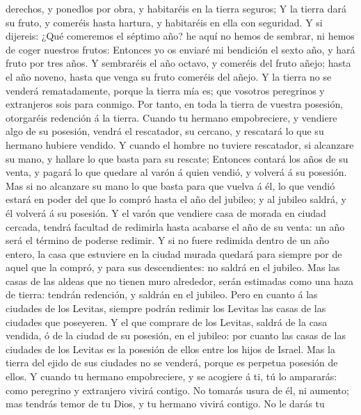 derechos, y ponedlos por obra, y habitaréis en la tierra seguros;
 Y la tierra dará su fruto, y comeréis hasta hartura, y
habitaréis en ella con seguridad.  Y si dijereis: ¿Qué
comeremos el séptimo año? he aquí no hemos de sembrar, ni hemos de coger
nuestros frutos:  Entonces yo os enviaré mi bendición el
sexto año, y hará fruto por tres años.  Y sembraréis el año
octavo, y comeréis del fruto añejo; hasta el año noveno, hasta que venga
su fruto comeréis del añejo.  Y la tierra no se venderá
rematadamente, porque la tierra mía es; que vosotros peregrinos y
extranjeros sois para conmigo.  Por tanto, en toda la
tierra de vuestra posesión, otorgaréis redención á la tierra.
 Cuando tu hermano empobreciere, y vendiere algo de su
posesión, vendrá el rescatador, su cercano, y rescatará lo que su
hermano hubiere vendido.  Y cuando el hombre no tuviere
rescatador, si alcanzare su mano, y hallare lo que basta para su
rescate;  Entonces contará los años de su venta, y pagará
lo que quedare al varón á quien vendió, y volverá á su posesión.
 Mas si no alcanzare su mano lo que basta para que vuelva á
él, lo que vendió estará en poder del que lo compró hasta el año del
jubileo; y al jubileo saldrá, y él volverá á su posesión. 
Y el varón que vendiere casa de morada en ciudad cercada, tendrá
facultad de redimirla hasta acabarse el año de su venta: un año será el
término de poderse redimir.  Y si no fuere redimida dentro
de un año entero, la casa que estuviere en la ciudad murada quedará para
siempre por de aquel que la compró, y para sus descendientes: no saldrá
en el jubileo.  Mas las casas de las aldeas que no tienen
muro alrededor, serán estimadas como una haza de tierra: tendrán
redención, y saldrán en el jubileo.  Pero en cuanto á las
ciudades de los Levitas, siempre podrán redimir los Levitas las casas de
las ciudades que poseyeren.  Y el que comprare de los
Levitas, saldrá de la casa vendida, ó de la ciudad de su posesión, en el
jubileo: por cuanto las casas de las ciudades de los Levitas es la
posesión de ellos entre los hijos de Israel.  Mas la tierra
del ejido de sus ciudades no se venderá, porque es perpetua posesión de
ellos.  Y cuando tu hermano empobreciere, y se acogiere á
ti, tú lo ampararás: como peregrino y extranjero vivirá contigo.
 No tomarás usura de él, ni aumento; mas tendrás temor de
tu Dios, y tu hermano vivirá contigo.  No le darás tu
